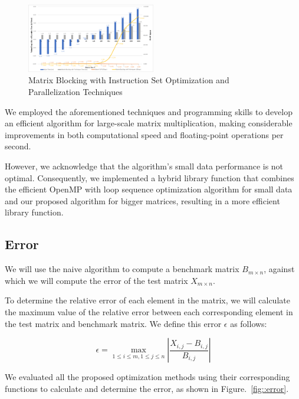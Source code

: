 \documentclass[conference]{IEEEtran}
\begin{document}
	\begin{figure}[htbp]
		\centerline{\includegraphics[width=0.5\textwidth]{fig9.png}}
		\caption{Matrix Blocking with Instruction Set Optimization and Parallelization Techniques}
		\label{fig::matrixfinal}
	\end{figure}

	We employed the aforementioned techniques and programming skills to develop an efficient algorithm for large-scale matrix multiplication, making considerable improvements in both computational speed and floating-point operations per second.
	
	However, we acknowledge that the algorithm's small data performance is not optimal. Consequently, we implemented a hybrid library function that combines the efficient OpenMP with loop sequence optimization algorithm for small data and our proposed algorithm for bigger matrices, resulting in a more efficient library function.
	
	\subsection{Error}
	
	We will use the naive algorithm to compute a benchmark matrix $B_{m \times n}$, against which we will compute the error of the test matrix $X_{m \times n}$.
	
	To determine the relative error of each element in the matrix, we will calculate the maximum value of the relative error between each corresponding element in the test matrix and benchmark matrix. We define this error $\epsilon$ as follows: 
	
	\begin{equation}
		\epsilon = \max\limits_{1 \leq i \leq m, 1 \leq j \leq n} \left| \frac{X_{i,j} - B_{i,j}}{B_{i,j}} \right |
	\end{equation}
	
	
	
	We evaluated all the proposed optimization methods using their corresponding functions to calculate and determine the error, as shown in Figure.~\ref{fig::error}.
\end{document}
